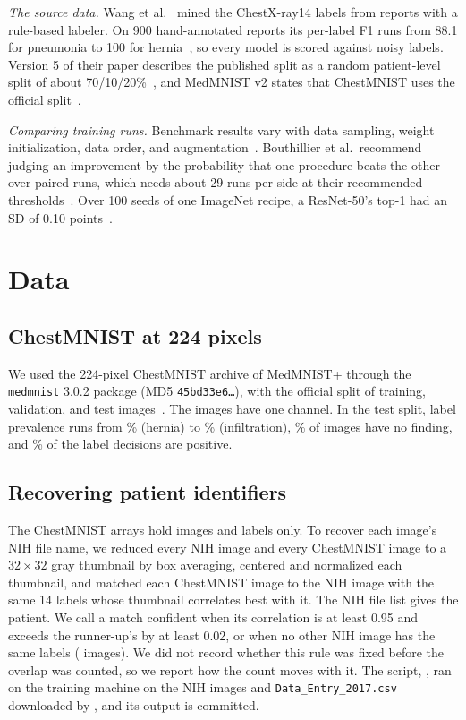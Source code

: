 \documentclass[conference]{IEEEtran}
\newif\ifanycitation
\let\citeAnyKey\cite
\renewcommand{\cite}{\global\anycitationtrue\citeAnyKey}
\begin{document}
\emph{The source data.} Wang et al.~\cite{wang2017chestxray8} mined the ChestX-ray14
labels from reports with a rule-based labeler. On 900 hand-annotated reports its per-label
F1 runs from 88.1 for pneumonia to 100 for hernia~\cite{wang2017chestxray8}, so every
model is scored against noisy labels. Version 5 of their paper describes the published
split as a random patient-level split of about 70/10/20\%~\cite{wang2017chestxray8}, and
MedMNIST v2 states that ChestMNIST uses the official split~\cite{yang2023medmnist}.

\emph{Comparing training runs.} Benchmark results vary with data sampling, weight
initialization, data order, and augmentation~\cite{bouthillier2021variance}. Bouthillier
et al.\ recommend judging an improvement by the probability that one procedure beats the
other over paired runs, which needs about 29 runs per side at their recommended
thresholds~\cite{bouthillier2021variance}. Over 100 seeds of one ImageNet recipe, a
ResNet-50's top-1 had an SD of 0.10 points~\cite{wightman2021resnet}.

\section{Data}
\label{sec:data}

\subsection{ChestMNIST at 224 pixels}

We used the 224-pixel ChestMNIST archive of MedMNIST+ through the \texttt{medmnist} 3.0.2
package (MD5 \texttt{45bd33e6\ldots}), with the official split of \rowsTrain{} training,
\rowsVal{} validation, and \testN{} test images~\cite{yang2023medmnist}. The images have
one channel. In the test split, label prevalence runs from \prevMinPct\% (hernia) to
\prevMaxPct\% (infiltration), \noFindingPct\% of images have no finding, and
\% of the  label decisions are positive.

\subsection{Recovering patient identifiers}
\label{sec:patients}

The ChestMNIST arrays hold images and labels only. To recover each image's NIH file name,
we reduced every NIH image and every ChestMNIST image to a $32\times32$ gray thumbnail by
box averaging, centered and normalized each thumbnail, and matched each ChestMNIST image
to the NIH image with the same 14 labels whose thumbnail correlates best with it. The NIH
file list gives the patient. We call a match confident when its correlation is at least
0.95 and exceeds the runner-up's by at least 0.02, or when no other NIH image has the same
labels (\sureNoRunnerUp{} images). We did not record whether this rule was fixed before the
overlap was counted, so we report how the count moves with it. The script,
, ran on the training machine on the NIH
images and \texttt{Data\_Entry\_2017.csv} downloaded by
, and its output is committed.
\end{document}
